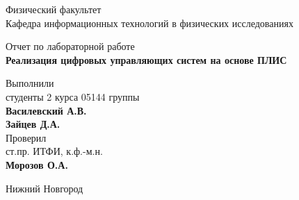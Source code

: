 

\makeatletter
\begin{titlepage}
	
	\newpage
	
    \noindent{}
    
	\vspace*{50pt}
    
	Физический факультет \\[\baselineskip]
    
	Кафедра информационных технологий в физических исследованиях

	\vspace*{100pt}

	Отчет по лабораторной работе \\[\baselineskip]

	{\LARGE\textbf{Реализация цифровых управляющих систем на основе ПЛИС}}

	\vspace*{\fill}

	\hfill\begin{minipage}{15em}
    	Выполнили\\
		студенты 2 курса 05144 группы\\
		\textbf{Василевский А.В.}\\
		\textbf{Зайцев Д.А.}\\
		
		Проверил\\
		ст.пр. ИТФИ, к.ф.-м.н.\\
		\textbf{Морозов О.А.}
    \end{minipage}
    
	
    
	\vspace*{\fill}
    
	Нижний Новгород\par
    
	
\end{titlepage}
\makeatother